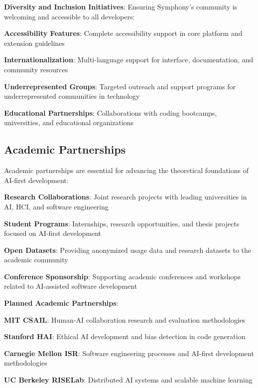 \textbf{Diversity and Inclusion Initiatives}:
Ensuring Symphony's community is welcoming and accessible to all developers:

\begin{compactlist}
    \item \textbf{Accessibility Features}: Complete accessibility support in core platform and extension guidelines
    \item \textbf{Internationalization}: Multi-language support for interface, documentation, and community resources
    \item \textbf{Underrepresented Groups}: Targeted outreach and support programs for underrepresented communities in technology
    \item \textbf{Educational Partnerships}: Collaborations with coding bootcamps, universities, and educational organizations
\end{compactlist}

\subsection*{Academic Partnerships}

Academic partnerships are essential for advancing the theoretical foundations of AI-first development:

\begin{expandedlist}
    \item \textbf{Research Collaborations}: Joint research projects with leading universities in AI, HCI, and software engineering
    \item \textbf{Student Programs}: Internships, research opportunities, and thesis projects focused on AI-first development
    \item \textbf{Open Datasets}: Providing anonymized usage data and research datasets to the academic community
    \item \textbf{Conference Sponsorship}: Supporting academic conferences and workshops related to AI-assisted software development
\end{expandedlist}

\textbf{Planned Academic Partnerships}:
\begin{compactlist}
    \item \textbf{MIT CSAIL}: Human-AI collaboration research and evaluation methodologies
    \item \textbf{Stanford HAI}: Ethical AI development and bias detection in code generation
    \item \textbf{Carnegie Mellon ISR}: Software engineering processes and AI-first development methodologies
    \item \textbf{UC Berkeley RISELab}: Distributed AI systems and scalable machine learning
\end{compactlist}

